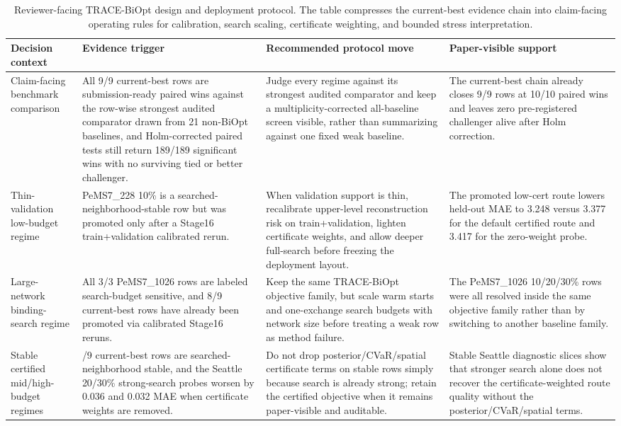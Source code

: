 \begin{table}[pos=htbp]
\centering
\caption{Reviewer-facing TRACE-BiOpt design and deployment protocol. The table compresses the current-best evidence chain into claim-facing operating rules for calibration, search scaling, certificate weighting, and bounded stress interpretation.}
\label{tab:trace-biopt-design-protocol}
\scriptsize
\begin{tabularx}{\textwidth}{>{\raggedright\arraybackslash}p{}>{\raggedright\arraybackslash}p{}>{\raggedright\arraybackslash}p{}>{\raggedright\arraybackslash}X}
\toprule
Decision context & Evidence trigger & Recommended protocol move & Paper-visible support \\
\midrule
Claim-facing benchmark comparison & All 9/9 current-best rows are submission-ready paired wins against the row-wise strongest audited comparator drawn from 21 non-BiOpt baselines, and Holm-corrected paired tests still return 189/189 significant wins with no surviving tied or better challenger. & Judge every regime against its strongest audited comparator and keep a multiplicity-corrected all-baseline screen visible, rather than summarizing against one fixed weak baseline. & The current-best chain already closes 9/9 rows at 10/10 paired wins and leaves zero pre-registered challenger alive after Holm correction. \\
Thin-validation low-budget regime & PeMS7\_228 10\% is a searched-neighborhood-stable row but was promoted only after a Stage16 train+validation calibrated rerun. & When validation support is thin, recalibrate upper-level reconstruction risk on train+validation, lighten certificate weights, and allow deeper full-search before freezing the deployment layout. & The promoted low-cert route lowers held-out MAE to 3.248 versus 3.377 for the default certified route and 3.417 for the zero-weight probe. \\
Large-network binding-search regime & All 3/3 PeMS7\_1026 rows are labeled search-budget sensitive, and 8/9 current-best rows have already been promoted via calibrated Stage16 reruns. & Keep the same TRACE-BiOpt objective family, but scale warm starts and one-exchange search budgets with network size before treating a weak row as method failure. & The PeMS7\_1026 10/20/30\% rows were all resolved inside the same objective family rather than by switching to another baseline family. \\
Stable certified mid/high-budget regimes & 6/9 current-best rows are searched-neighborhood stable, and the Seattle 20/30\% strong-search probes worsen by 0.036 and 0.032 MAE when certificate weights are removed. & Do not drop posterior/CVaR/spatial certificate terms on stable rows simply because search is already strong; retain the certified objective when it remains paper-visible and auditable. & Stable Seattle diagnostic slices show that stronger search alone does not recover the certificate-weighted route quality without the posterior/CVaR/spatial terms. \\

\end{tabularx}
\end{table}
